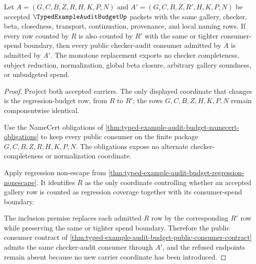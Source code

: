\begin{theorem}
\label{thm:typed-example-audit-budget-public-coverage-monotonicity}
Let $A=(G,C,B,Z,R,H,K,P,N)$ and $A'=(G,C,B,Z,R',H,K,P,N)$ be accepted $\TypedExampleAuditBudgetUp$ packets with the same gallery, checker, beta, closedness, transport, continuation, provenance, and local naming rows. If every row counted by $R$ is also counted by $R'$ with the same or tighter consumer-spend boundary, then every public checker-audit consumer admitted by $A$ is admitted by $A'$. The monotone replacement exports no checker completeness, subject reduction, normalization, global beta closure, arbitrary gallery soundness, or unbudgeted spend.
\end{theorem}
\begin{proof}
Project both accepted carriers. The only displayed coordinate that changes is the regression-budget row, from $R$ to $R'$; the rows $G,C,B,Z,H,K,P,N$ remain componentwise identical.

Use the NameCert obligations of \autoref{thm:typed-example-audit-budget-namecert-obligations} to keep every public consumer on the finite package $G,C,B,Z,R,H,K,P,N$. The obligations expose no alternate checker-completeness or normalization coordinate.

Apply regression non-escape from \autoref{thm:typed-example-audit-budget-regression-nonescape}. It identifies $R$ as the only coordinate controlling whether an accepted gallery row is counted as regression coverage together with its consumer-spend boundary.

The inclusion premise replaces each admitted $R$ row by the corresponding $R'$ row while preserving the same or tighter spend boundary. Therefore the public consumer contract of \autoref{thm:typed-example-audit-budget-public-consumer-contract} admits the same checker-audit consumer through $A'$, and the refused endpoints remain absent because no new carrier coordinate has been introduced.
\end{proof}



